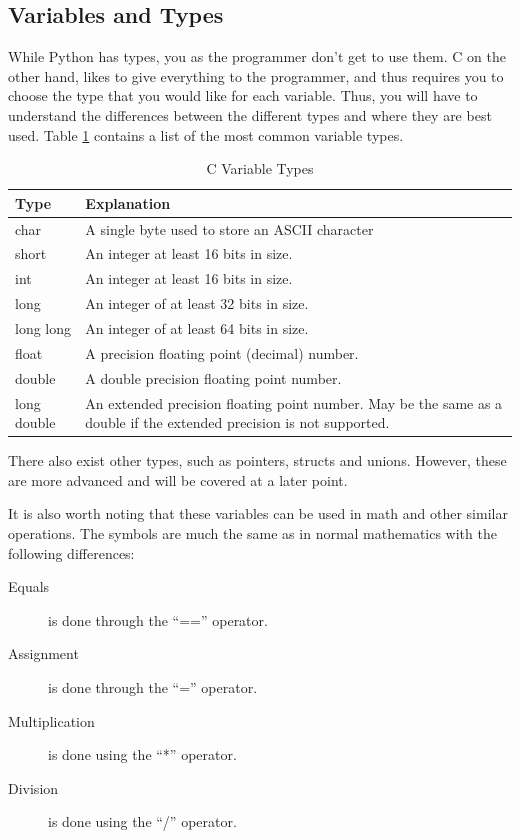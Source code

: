 \documentclass[a4paper,11pt]{report}
\begin{document}
		\subsection{Variables and Types}
			While Python has types, you as the programmer don't get to use them. 
			C on the other hand, likes to give everything to the programmer, and thus requires you to choose the type that you would like for each variable. 
			Thus, you will have to understand the differences between the different types and where they are best used. 
			Table \ref{tab:CVariableTypes} contains a list of the most common variable types. 
			\begin{table}[htb]
				\centering
				\begin{tabular}{| l | p{8cm} |}
					\hline
					\textbf{Type} & \textbf{Explanation} \\ \hline 
					char & A single byte used to store an ASCII character \\ \hline \hline
					short & An integer at least 16 bits in size. \\ \hline
					int & An integer at least 16 bits in size. \\ \hline
					long & An integer of at least 32 bits in size. \\ \hline
					long long & An integer of at least 64 bits in size. \\ \hline \hline
					float & A precision floating point (decimal) number. \\ \hline
					double & A double precision floating point number. \\ \hline
					long double & An extended precision floating point number. 
					May be the same as a double if the extended precision is not supported. \\ \hline 
				\end{tabular}
				\caption{C Variable Types}
				\label{tab:CVariableTypes}
			\end{table}
			There also exist other types, such as pointers, structs and unions. 
			However, these are more advanced and will be covered at a later point. 

			It is also worth noting that these variables can be used in math and other similar operations. 
			The symbols are much the same as in normal mathematics with the following differences:
			\begin{description}
				\item[Equals] is done through the ``=='' operator.
				\item[Assignment] is done through the ``='' operator.
				\item[Multiplication] is done using the ``*'' operator.
				\item[Division] is done using the ``/'' operator. 
			\end{description}
\end{document}
